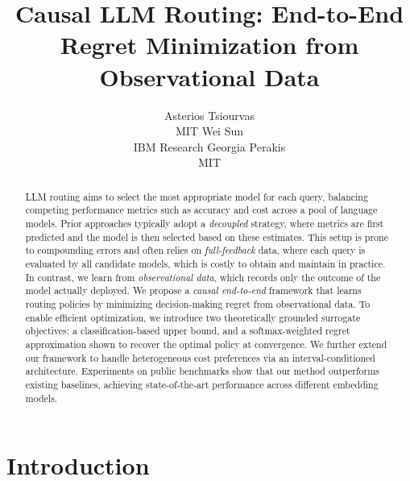 \documentclass{article}
\title{Causal LLM Routing: End-to-End Regret Minimization from Observational Data}
\author{%
  Asterios Tsiourvas\\
  MIT %
  \And
  Wei Sun\\
   IBM Research %
  \And
  Georgia Perakis \\
  MIT
}
\theoremstyle{remark}
\begin{document}
\maketitle


\begin{abstract}
LLM routing aims to select the most appropriate model for each query, balancing competing performance metrics such as accuracy and cost across a pool of language models. Prior approaches typically adopt a \emph{decoupled} strategy, where metrics are first predicted and the model is then selected based on these estimates. This setup is prone to compounding errors and often relies on \emph{full-feedback} data, where each query is evaluated by all candidate models, which is costly to obtain and maintain in practice. In contrast, we learn from \emph{observational data}, which records only the outcome of the model actually deployed. We propose a \emph{causal end-to-end} framework that learns routing policies by minimizing decision-making regret from observational data. To enable efficient optimization, we introduce two theoretically grounded surrogate objectives: a classification-based upper bound, and a softmax-weighted regret approximation shown to recover the optimal policy at convergence. We further extend our framework to handle heterogeneous cost preferences via an interval-conditioned architecture. Experiments on public benchmarks show that our method outperforms existing baselines, achieving state-of-the-art performance across different embedding models. 
\end{abstract}

\section{Introduction}

\end{document}
